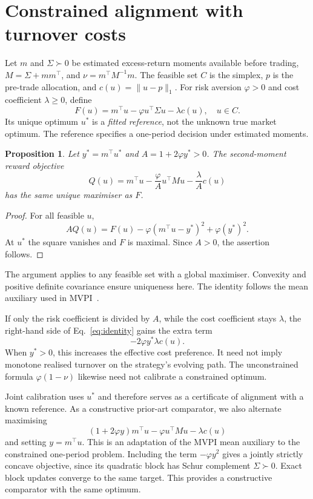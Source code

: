 \documentclass[sigconf,anonymous,review]{acmart}
\newtheorem{proposition}{Proposition}
\begin{document}
\section{Constrained alignment with turnover costs}
Let $m$ and $\Sigma\succ0$ be estimated excess-return moments available before trading, $M=\Sigma+mm^\top$, and $\nu=m^\top M^{-1}m$. The feasible set $C$ is the simplex, $p$ is the pre-trade allocation, and $c(u)=\|u-p\|_1$. For risk aversion $\varphi>0$ and cost coefficient $\lambda\ge0$, define
\begin{equation}\label{eq:target}
 F(u)=m^\top u-\varphi u^\top\Sigma u-\lambda c(u),\quad u\in C.
\end{equation}
Its unique optimum $u^*$ is a \emph{fitted reference}, not the unknown true market optimum. The reference specifies a one-period decision under estimated moments.

\begin{proposition}\label{prop:joint}
Let $y^*=m^\top u^*$ and $A=1+2\varphi y^*>0$. The second-moment reward objective
\begin{equation}
 Q(u)=m^\top u-\frac{\varphi}{A}u^\top M u-\frac{\lambda}{A}c(u)
\end{equation}
has the same unique maximiser as $F$.
\end{proposition}
\begin{proof}
For all feasible $u$,
\begin{equation}\label{eq:identity}
 AQ(u)=F(u)-\varphi(m^\top u-y^*)^2+\varphi(y^*)^2.
\end{equation}
At $u^*$ the square vanishes and $F$ is maximal. Since $A>0$, the assertion follows.
\end{proof}
The argument applies to any feasible set with a global maximiser. Convexity and positive definite covariance ensure uniqueness here. The identity follows the mean auxiliary used in MVPI\ \cite{zhang2021}.

If only the risk coefficient is divided by $A$, while the cost coefficient stays $\lambda$, the right-hand side of Eq.\ \eqref{eq:identity} gains the extra term
\begin{equation}\label{eq:costdistortion}
 -2\varphi y^*\lambda c(u).
\end{equation}
When $y^*>0$, this increases the effective cost preference. It need not imply monotone realised turnover on the strategy's evolving path. The unconstrained formula $\varphi(1-\nu)$ likewise need not calibrate a constrained optimum.

Joint calibration uses $u^*$ and therefore serves as a certificate of alignment with a known reference. As a constructive prior-art comparator, we also alternate maximising
\begin{equation}
 (1+2\varphi y)m^\top u-\varphi u^\top Mu-\lambda c(u)
\end{equation}
and setting $y=m^\top u$. This is an adaptation of the MVPI mean auxiliary to the constrained one-period problem. Including the term $-\varphi y^2$ gives a jointly strictly concave objective, since its quadratic block has Schur complement $\Sigma\succ0$. Exact block updates converge to the same target. This provides a constructive comparator with the same optimum.
\end{document}
